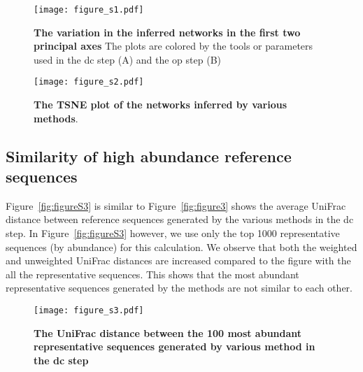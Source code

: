     \begin{figure}[H]
      \centering
      \texttt{[image: figure\_s1.pdf]}
    \end{figure}
    \begin{figure}[H]
      \centering
        \caption{
          \textbf{The variation in the inferred networks in the first two principal axes}
          The plots are colored by the tools or parameters used in the \ac{dc} step (A) and the \ac{op} step (B)
        }
      \label{fig:figure_s1}
    \end{figure}
    \FloatBarrier
    \newpage

    \begin{figure}[H]
      \centering
      \texttt{[image: figure\_s2.pdf]}
    \end{figure}
    \begin{figure}[H]
      \centering
        \caption{
          \textbf{The TSNE plot of the networks inferred by various methods}.
        }
      \label{fig:figure_s2}
    \end{figure}
    \FloatBarrier
    \newpage


  \subsection*{Similarity of high abundance reference sequences}

    Figure~\ref{fig:figureS3} is similar to Figure~\ref{fig:figure3} shows the average UniFrac distance between reference sequences generated by the various methods in the \ac{dc} step.
    In Figure~\ref{fig:figureS3} however, we use only the top 1000 representative sequences (by abundance) for this calculation.
    We observe that both the weighted and unweighted UniFrac distances are increased compared to the figure with the all the representative sequences.
    This shows that the most abundant representative sequences generated by the methods are not similar to each other.

    \begin{figure}[H]
      \centering
      \texttt{[image: figure\_s3.pdf]}
    \end{figure}
    \begin{figure}[H]
      \centering
        \caption{
          \textbf{The UniFrac distance between the 100 most abundant representative sequences generated by various method in the \ac{dc} step}
        }
      \label{fig:figure_s3}
    \end{figure}
    \FloatBarrier
    \newpage

